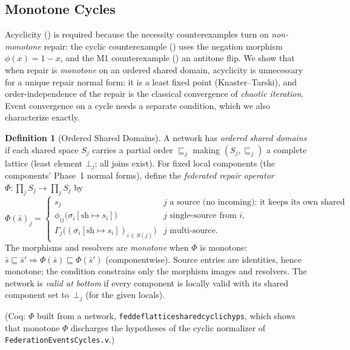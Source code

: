 \documentclass[11pt,a4paper]{article}
\theoremstyle{plain}
\theoremstyle{definition}
\newtheorem{definition}[theorem]{Definition}
\theoremstyle{remark}
\renewcommand{\_}{\textunderscore\allowbreak}
\begin{document}
\subsection{Monotone Cycles}
\label{sec:monotone}

Acyclicity () is required because the
necessity counterexamples turn on \emph{non-monotone} repair: the cyclic
counterexample () uses the negation morphism
$\phi(x) = 1 - x$, and the M1 counterexample () an
antitone flip.  We show that when repair is \emph{monotone} on an ordered shared
domain, acyclicity is unnecessary for a unique repair normal form: it is a least
fixed point (Knaster--Tarski), and order-independence of the repair is the
classical convergence of \emph{chaotic iteration}.  Event convergence on a
cycle needs a separate condition, which we also characterize exactly.

\begin{definition}[Ordered Shared Domains]
\label{def:lattice-shared}
A network has \emph{ordered shared domains} if each shared space $S_j$ carries a
partial order $\sqsubseteq_j$ making $(S_j, \sqsubseteq_j)$ a complete lattice
(least element $\bot_j$; all joins exist).  For fixed local components (the
components' Phase~1 normal forms), define the \emph{federated repair
operator} $\Phi : \prod_j S_j \to \prod_j S_j$ by
\[
  \Phi(\bar{s})_j =
  \begin{cases}
    s_j
      & \text{$j$ a source (no incoming): it keeps its own shared value,}\\[2pt]
    \phi_{ij}\big(\sigma_i[\mathrm{sh}\mapsto s_i]\big)
      & \text{$j$ single-source from $i$,}\\[2pt]
    \Gamma_j\big((\sigma_i[\mathrm{sh}\mapsto s_i])_{i \in S(j)}\big)
      & \text{$j$ multi-source.}
  \end{cases}
\]
The morphisms and resolvers are \emph{monotone} when $\Phi$ is monotone:
$\bar{s} \sqsubseteq \bar{s}' \Rightarrow \Phi(\bar{s}) \sqsubseteq \Phi(\bar{s}')$
(componentwise).  Source entries are identities, hence monotone; the
condition constrains only the morphism images and resolvers.  The network is
\emph{valid at bottom} if every component is locally valid with its shared
component set to~$\bot_j$ (for the given locals).
\end{definition}

(Coq: $\Phi$ built from a network, \texttt{fed\_def\_lattice\_shared\_cyclic\_hyps},
which shows that monotone $\Phi$ discharges the hypotheses of the cyclic
normalizer of \texttt{FederationEventsCycles.v}.)
\end{document}
